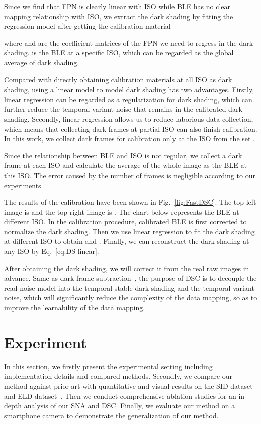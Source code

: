 \documentclass[sigconf,screen,nonacm]{acmart}
\begin{document}
Since we find that FPN is clearly linear with ISO while BLE has no clear mapping relationship with ISO, we extract the dark shading by fitting the regression model after getting the calibration material
    
    where  and  are the coefficient matrices of the FPN we need to regress in the dark shading.  is the BLE at a specific ISO, which can be regarded as the global average of dark shading.

    Compared with directly obtaining calibration materials at all ISO as dark shading, using a linear model to model dark shading has two advantages.
    Firstly, linear regression can be regarded as a regularization for dark shading, which can further reduce the temporal variant noise that remains in the calibrated dark shading.
    Secondly, linear regression allows us to reduce laborious data collection, which means that collecting dark frames at partial ISO can also finish calibration.
    In this work, we collect dark frames for calibration only at the ISO from the set .


    Since the relationship between BLE and ISO is not regular, we collect a dark frame at each ISO and calculate the average of the whole image as the BLE at this ISO. The error caused by the number of frames is negligible according to our experiments. 
    


    The results of the calibration have been shown in Fig.~\ref{fig:FastDSC}. The top left image is  and the top right image is . The chart below represents the BLE at different ISO.
    In the calibration procedure, calibrated BLE is first corrected to normalize the dark shading. Then we use linear regression to fit the dark shading at different ISO to obtain  and . Finally, we can reconstruct the dark shading at any ISO by Eq.~\eqref{eq:DS-linear}.

After obtaining the dark shading, we will correct it from the real raw images in advance.
Same as dark frame subtraction~\cite{naiveDSC,DFS}, the purpose of DSC is to decouple the read noise model  into the temporal stable dark shading and the temporal variant noise, which will significantly reduce the complexity of the data mapping, so as to improve the learnability of the data mapping.






\section{Experiment}
    In this section, we firstly present the experimental setting including implementation details and compared methods.
Secondly, we compare our method against prior art with quantitative and visual results on the SID dataset~\cite{CVPR18/SID} and ELD dataset~\cite{TPAMI21/ELD}.
    Then we conduct comprehensive ablation studies for an in-depth analysis of our SNA and DSC.
    Finally, we evaluate our method on a smartphone camera to demonstrate the generalization of our method.
\end{document}
